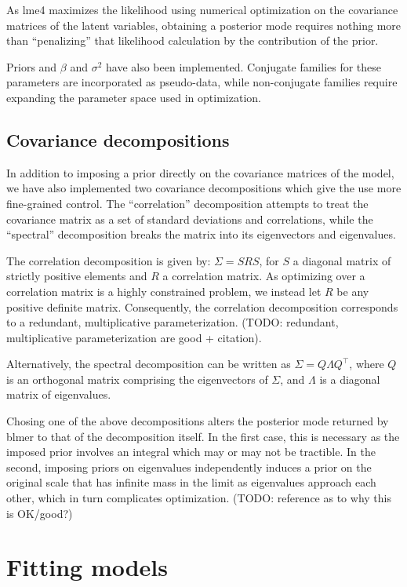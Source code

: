 \documentclass[10pt]{article}
\newcommand{\pkg}[1]{{\fontseries{b}\selectfont #1}}
\begin{document}
As \pkg{lme4} maximizes the likelihood using numerical optimization
on the covariance matrices of the latent variables, obtaining a
posterior mode requires nothing more than ``penalizing'' that
likelihood calculation by the contribution of the prior.

Priors and $\beta$ and $\sigma^2$ have also been
implemented. Conjugate families for these parameters are incorporated
as pseudo-data, while non-conjugate families require expanding the
parameter space used in optimization.

\subsection[Covariance decompositions]{Covariance decompositions}

In addition to imposing a prior directly on the covariance matrices of
the model, we have also implemented two covariance decompositions
which give the use more fine-grained control. The ``correlation''
decomposition attempts to treat the covariance matrix as a set of standard
deviations and correlations, while the ``spectral'' decomposition
breaks the matrix into its eigenvectors and eigenvalues.

The correlation decomposition is given by: $\Sigma = SRS$, for $S$
a diagonal matrix of strictly positive elements and $R$ a correlation
matrix. As optimizing over a correlation matrix is a highly
constrained problem, we instead let $R$ be any positive definite
matrix. Consequently, the correlation decomposition corresponds to a
redundant, multiplicative parameterization. (TODO: redundant, multiplicative
parameterization are good + citation).

Alternatively, the spectral decomposition can be written as $\Sigma =
Q\Lambda Q^\top$, where $Q$ is an orthogonal matrix comprising the
eigenvectors of $\Sigma$, and $\Lambda$ is a
diagonal matrix of eigenvalues. 

Chosing one of the above decompositions alters the posterior mode
returned by \pkg{blmer} to that of the decomposition itself. In the
first case, this is necessary as the imposed prior involves an
integral which may or may not be tractible. In the second, imposing
priors on eigenvalues independently induces a prior on the original
scale that has infinite mass in the limit as eigenvalues approach each
other, which in turn complicates optimization. (TODO: reference as to
why this is OK/good?)

\section[Fitting models]{Fitting models}
\end{document}

